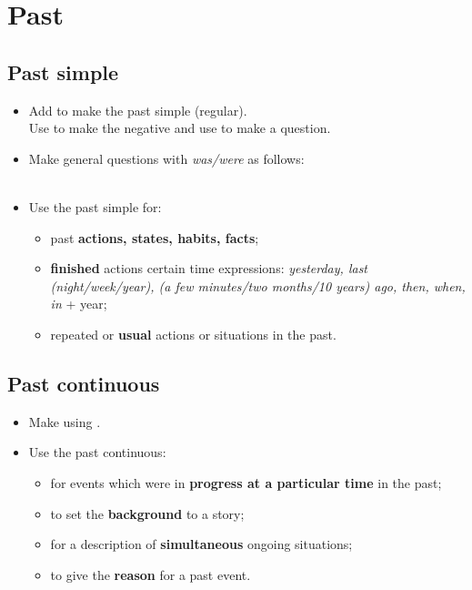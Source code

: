 \section{Past}

\subsection{Past simple}
\begin{itemize}
    \item Add  to make the past simple (regular).\\
    Use  to make the negative
    and use  to make a question.
    \item Make general questions with \textit{was/were} as follows:\\
    \\
    \item Use the past simple for:
    \begin{itemize}
        \item past \textbf{actions, states, habits, facts};
        \item \textbf{finished} actions  certain time expressions:
        \textit{yesterday, last (night/week/year), (a few minutes/two months/10 years) ago, then, when, in} + year;
        \item[\daash] repeated or \textbf{usual} actions or situations in the past.
    \end{itemize}
\end{itemize}

\subsection{Past continuous}
\begin{itemize}
    \item Make using .
    \item Use the past continuous:
    \begin{itemize}
        \item for events which were in \textbf{progress at a particular time} in the past;
        \item to set the \textbf{background} to a story;
        \item for a description of \textbf{simultaneous} ongoing situations;
        \item to give the \textbf{reason} for a past event.
    \end{itemize}
\end{itemize}

